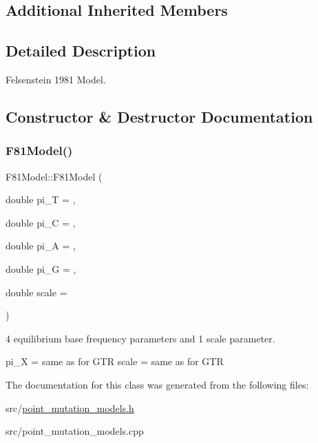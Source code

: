\subsection*{Additional Inherited Members}


\subsection{Detailed Description}
Felsenstein 1981 Model. 

\subsection{Constructor \& Destructor Documentation}
\mbox{\label{classrcombinator_1_1F81Model_a80c3357497cdc6b91ff4c408750b47bb}} 
\subsubsection{\texorpdfstring{F81\+Model()}{F81Model()}}
{\footnotesize\ttfamily F81\+Model\+::\+F81\+Model (\begin{DoxyParamCaption}\item[{double}]{pi\+\_\+T = {},  }\item[{double}]{pi\+\_\+C = {},  }\item[{double}]{pi\+\_\+A = {},  }\item[{double}]{pi\+\_\+G = {},  }\item[{double}]{scale = {} }\end{DoxyParamCaption})}



4 equilibrium base frequency parameters and 1 scale parameter. 

pi\+\_\+X = same as for G\+TR scale = same as for G\+TR 

The documentation for this class was generated from the following files\+:\begin{DoxyCompactItemize}
\item 
src/\mbox{\hyperlink{point__mutation__models_8h}{point\+\_\+mutation\+\_\+models.\+h}}\item 
src/point\+\_\+mutation\+\_\+models.\+cpp\end{DoxyCompactItemize}
